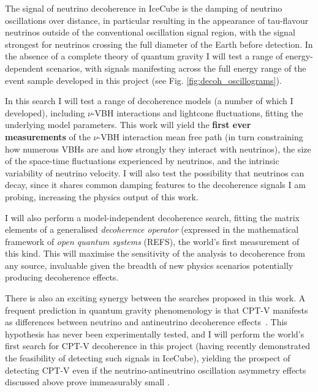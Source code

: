 \documentclass[a4paper,11pt]{article}
\begin{document}
The signal of neutrino decoherence in IceCube is the damping of neutrino oscillations over distance, in particular resulting in the appearance of tau-flavour neutrinos outside of the conventional oscillation signal region, with the signal strongest for neutrinos crossing the full diameter of the Earth before detection. In the absence of a complete theory of quantum gravity I will test a range of energy-dependent scenarios, with signals manifesting across the full energy range of the event sample developed in this project (see Fig. \ref{fig:decoh_oscillograms}).

In this search I will test a range of decoherence models (a number of which I developed), including $\nu$-VBH interactions and lightcone fluctuations, fitting the underlying model parameters. This work will yield the \textbf{first ever measurements} of the $\nu$-VBH interaction mean free path (in turn constraining how numerous VBHs are and how strongly they interact with neutrinos), the size of the space-time fluctuations experienced by neutrinos, and the intrinsic variability of neutrino velocity. I will also test the possibility that neutrinos can decay, since it shares common damping features to the decoherence signals I am probing, increasing the physics output of this work.

I will also perform a model-independent decoherence search, fitting the matrix elements of a generalised \textit{decoherence operator} (expressed in the mathematical framework of \textit{open quantum systems} (REFS), the world's first measurement of this kind. This will maximise the sensitivity of the analysis to decoherence from any source, invaluable given the breadth of new physics scenarios potentially producing decoherence effects. 


There is also an exciting synergy between the searches proposed in this work. A frequent prediction in quantum gravity phenomenology is that CPT-V manifests as differences between neutrino and antineutrino decoherence effects~\cite{Mavromatos_2009, Barenboim:2004wu, Carrasco:2018sca, Buoninfante:2020iyr, Capolupo:2020myw}. This hypothesis has never been experimentally tested, and I will perform the world's first search for CPT-V decoherence in this project (having recently demonstrated the feasibility of detecting such signals in IceCube), yielding the prospect of detecting CPT-V even if the neutrino-antineutrino oscillation asymmetry effects discussed above prove immeasurably small .
\end{document}
